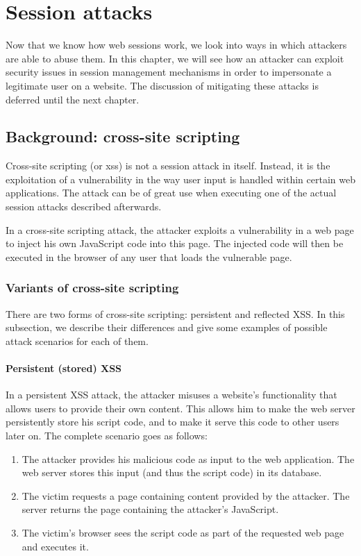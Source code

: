 \chapter{Session attacks}\label{attacks}

Now that we know how web sessions work, we look into ways in which attackers are able to abuse them. In this chapter, we will see how an attacker can exploit security issues in session management mechanisms in order to impersonate a legitimate user on a website. The discussion of mitigating these attacks is deferred until the next chapter.

\section{Background: cross-site scripting}\label{xss}

Cross-site scripting (or \gls{xss}) \cite{DiLucca2005} is not a session attack in itself. Instead, it is the exploitation of a vulnerability in the way user input is handled within certain web applications. The attack can be of great use when executing one of the actual session attacks described afterwards.

In a cross-site scripting attack, the attacker exploits a vulnerability in a web page to inject his own JavaScript code into this page. The injected code will then be executed in the browser of any user that loads the vulnerable page.

\subsection{Variants of cross-site scripting}
There are two forms of cross-site scripting: persistent and reflected XSS. In this subsection, we describe their differences and give some examples of possible attack scenarios for each of them.

\subsubsection{Persistent (stored) XSS}
In a persistent XSS attack, the attacker misuses a website's functionality that allows users to provide their own content. This allows him to make the web server persistently store his script code, and to make it serve this code to other users later on. The complete scenario goes as follows:

\begin{enumerate}
	\item The attacker provides his malicious code as input to the web application.  The web server stores this input (and thus the script code) in its database.
	\item The victim requests a page containing content provided by the attacker. The server returns the page containing the attacker's JavaScript.
	\item The victim's browser sees the script code as part of the requested web page and executes it.
\end{enumerate}

